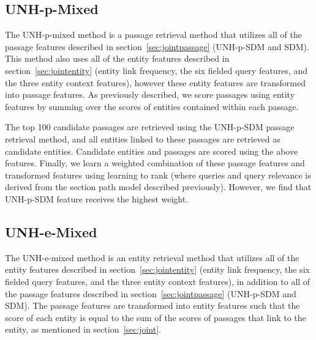 \documentclass{article}
\begin{document}







\subsection{UNH-p-Mixed}\label{sec:pmixed}

The UNH-p-mixed method is a passage retrieval method that utilizes all of the passage features described in section~\ref{sec:jointpassage} (UNH-p-SDM and SDM). This method also uses all of the entity features described in section~\ref{sec:jointentity} (entity link frequency, the six fielded query features, and the three entity context features), however these entity features are transformed into passage features. As previously described, we score passages using entity features by summing over the scores of entities contained within each passage.  

The top 100 candidate passages are retrieved using the UNH-p-SDM passage retrieval method, and all entities linked to these passages are retrieved as candidate entities. Candidate entities and passages are scored using the above features. Finally, we learn a weighted combination of these passage features and transformed features using learning to rank (where queries and query relevance is derived from the section path model described previously). However, we find that UNH-p-SDM feature receives the highest weight.



\subsection{UNH-e-Mixed}\label{sec:emixed}

The UNH-e-mixed method is an entity retrieval method that utilizes all of the entity features described in section~\ref{sec:jointentity} (entity link frequency, the six fielded query features, and the three entity context features), in addition to all of the passage features described in section~\ref{sec:jointpassage} (UNH-p-SDM and SDM). The passage features are transformed into entity features such that the score of each entity is equal to the sum of the scores of passages that link to the entity, as mentioned in section~\ref{sec:joint}.
\end{document}
